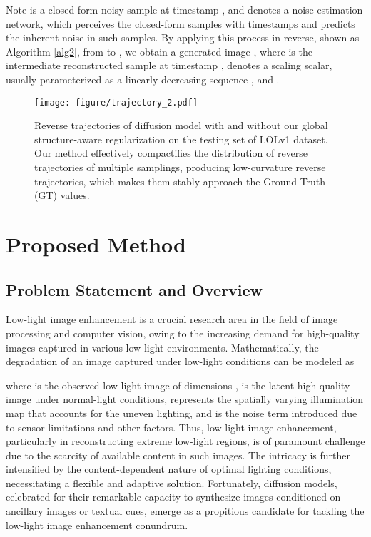 \documentclass{article}
\begin{document}
Note  is a closed-form noisy sample at timestamp , and  denotes a noise estimation network, which perceives the closed-form samples with timestamps and predicts the inherent noise in such samples. By applying this process in reverse, shown as Algorithm \ref{alg2}, from  to , we obtain a generated image , where   is the intermediate reconstructed sample at timestamp ,  denotes a scaling scalar, usually parameterized as a linearly decreasing sequence \cite{ho2020denoising,saharia2022image}, and .












\begin{figure}[t]
\centering
\texttt{[image: figure/trajectory\_2.pdf]}
\vspace{-0.3cm}
\caption{Reverse trajectories of diffusion model with and without our global structure-aware regularization on the testing set of LOLv1 dataset. Our method effectively compactifies the distribution of reverse trajectories of multiple samplings, producing low-curvature reverse trajectories, which makes them stably approach the Ground Truth (GT) values.}
\label{fig:trajectory}
\end{figure}

\section{Proposed Method}

\subsection{Problem Statement and Overview}\label{sec:Pfam}


Low-light image enhancement is a crucial research area in the field of image processing and computer vision, owing to the increasing demand for high-quality images captured in various low-light environments. Mathematically, the degradation of an image captured under low-light conditions can be modeled as

where  is the observed low-light image of dimensions ,  is the latent high-quality image under normal-light conditions,  represents the spatially varying illumination map that accounts for the uneven lighting, and  is the noise term introduced due to sensor limitations and other factors. Thus, low-light image enhancement, particularly in reconstructing extreme low-light regions, is of paramount challenge due to the scarcity of available content in such images. The intricacy is further intensified by the content-dependent nature of optimal lighting conditions, necessitating a flexible and adaptive solution. Fortunately, diffusion models, celebrated for their remarkable capacity to synthesize images conditioned on ancillary images or textual cues, emerge as a propitious candidate for tackling the low-light image enhancement conundrum.
\end{document}
